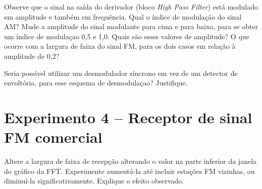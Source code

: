 \documentclass[12pt,addpoints]{exam}
\begin{document}
\begin{questions}
    \question Observe que o sinal na saída do derivador (bloco {\em High Pass Filter}) está modulado em amplitude e também em frequência. Qual o índice de modulação do sinal AM? Mude a amplitude do sinal modulante para cima e para baixo, para se obter um índice de modulaçao 0,5 e 1,0. Quais são esses valores de amplitude? O que ocorre com a largura de faixa do sinal FM, para os dois casos em relação à amplitude de 0,2?
    \fillwithlines{1in}

    \question Seria possível utilizar um desmodulador síncrono em vez de um detector de envoltória, para esse esquema de desmodulaçao? Justifique.
    \fillwithlines{1in}

\end{questions}

\section*{Experimento 4 -- Receptor de sinal FM comercial}

\begin{questions}
    \question Altere a largura de faixa de recepção alterando o valor na parte inferior da janela do gráfico da FFT. Experimente aumentá-la até incluir estações FM vizinhas, ou diminuí-la significativamente. Explique o efeito observado.
    \fillwithlines{1in}
    
\end{questions}
\end{document}
